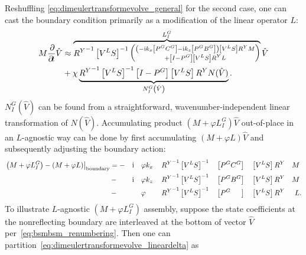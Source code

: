 \label{sec:nrbc_mostly_implicit}
Reshuffling \eqref{eq:dimeulertransformevolve_general} for the second case, one
can cast the boundary condition primarily as a modification of the linear
operator $L$:
\begin{align}
\label{eq:dimeulertransformevolve_linear}
  M \frac{\partial\!}{\partial\!t}
  \hat{V}
&\approx
\overbrace{%
  {R^Y}^{-1}
  \left[V^L S\right]^{-1}
  \left(\substack{%
    \left(- \ii k_x \left[P^G C^G\right] - \ii k_z \left[P^G B^G\right] \right)
    \left[V^L S\right] R^Y M
    \\+
    \left[I-P^G\right] \left[V^L S\right] R^Y
    L
  }\right)
}^{L_I^G}
  \hat{V}
\notag\\
&{}+
  \chi
\underbrace{%
  {R^Y}^{-1}
  \left[V^L S\right]^{-1}
  \left[I - P^G\right] \left[V^L S\right] R^Y
  N(\hat{V})
}_{N_I^G\left(\hat{V}\right)}.
\end{align}
$N_I^G(\hat{V})$ can be found from a straightforward, wavenumber-independent
linear transformation of $N(\hat{V})$. Accumulating product
$\left(M+\varphi{}L_I^G\right)\hat{V}$ out-of-place in an $L$-agnostic way can
be done by first accumulating $\left(M+\varphi{}L\right)\hat{V}$ and
subsequently adjusting the boundary action:
\begin{alignat}{10}
\label{eq:dimeulertransformevolve_lineardelta}
\left.\left(M+\varphi{}L_I^G\right) - \left(M+\varphi{}L\right)\right|_\text{boundary}
  &= {}-&&\ii &&\varphi{} k_x \, &&{R^Y}^{-1} \left[V^L S\right]^{-1} &&\left[P^G C^G\right] &&\left[V^L S\right] {R^Y} & M& \notag\\
  &\,{}-&&\ii &&\varphi{} k_z    &&{R^Y}^{-1} \left[V^L S\right]^{-1} &&\left[P^G B^G\right] &&\left[V^L S\right] {R^Y} & M& \notag\\
  &\,{}-&&    &&\varphi{}        &&{R^Y}^{-1} \left[V^L S\right]^{-1} &&\left[P^G \phantom{B^G}   \right] &&\left[V^L S\right] {R^Y} & L&.
\end{alignat}
To illustrate $L$-agnostic $\left(M+\varphi{}L_I^G\right)$ assembly, suppose the
state coefficients at the nonreflecting boundary are interleaved at the bottom
of vector $\hat{V}$ per~\eqref{eq:bsmbsm_renumbering}. Then one can
partition~\eqref{eq:dimeulertransformevolve_lineardelta} as
